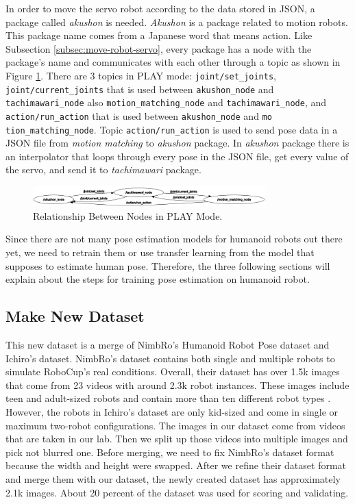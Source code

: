 In order to move the servo robot according to the data stored in JSON, a package called \emph{akushon} is needed. \emph{Akushon} is a package related to motion robots. This package name comes from a Japanese word that means action.
Like Subsection \ref{subsec:move-robot-servo}, every package has a node with the package's name and communicates with each other through a topic as shown in Figure \ref{fig:relation-node-play-mode}. There are 3 topics in PLAY mode: \verb|joint/set_joints|, \verb|joint/current_joints| that is used between \verb|akushon_node| and \verb|tachimawari_node| also \verb|motion_matching_node| and \verb|tachimawari_node|,
and \verb|action/run_action| that is used between \verb|akushon_node| and \verb|mo| \verb|tion_matching_node|.
Topic \verb|action/run_action| is used to send pose data in a JSON file from \emph{motion matching} to \emph{akushon} package. In \emph{akushon} package there is an interpolator that loops through every pose in the JSON file, get every value of the servo, and send it to \emph{tachimawari} package.
\begin{figure}[ht]
  \centering
  \includegraphics[width=0.8\textwidth]{gambar/rqt_akushon.png}
  \caption{Relationship Between Nodes in PLAY Mode.}
  \label{fig:relation-node-play-mode}
\end{figure}

Since there are not many pose estimation models for humanoid robots out there yet, we need to retrain them or use transfer learning from the model that supposes to estimate human pose.
Therefore, the three following sections will explain about the steps for training pose estimation on humanoid robot.

\subsection{Make New Dataset}
\label{subsec:make-new-dataset}

This new dataset is a merge of NimbRo's Humanoid Robot Pose dataset and Ichiro's dataset. NimbRo's dataset contains both single and multiple robots to simulate RoboCup's real conditions.
Overall, their dataset has over 1.5k images that come from 23 videos with around 2.3k robot instances. These images include teen and adult-sized robots and contain more than ten different robot types \citep{amini2021}.
However, the robots in Ichiro's dataset are only kid-sized and come in single or maximum two-robot configurations. The images in our dataset come from videos that are taken in our lab. 
Then we split up those videos into multiple images and pick not blurred one.
Before merging, we need to fix NimbRo's dataset format because the width and height were swapped.
After we refine their dataset format and merge them with our dataset, the newly created dataset has approximately 2.1k images.
About 20 percent of the dataset was used for scoring and validating.

